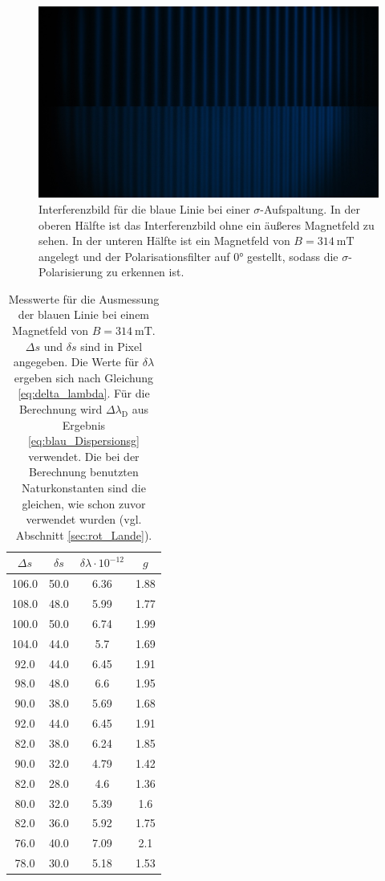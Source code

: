 \begin{figure}
  \centering
  \includegraphics[width=\textwidth]{blaucut5A.JPG}
  \caption{Interferenzbild für die blaue Linie bei einer $\sigma$-Aufspaltung.
  In der oberen Hälfte ist das Interferenzbild
  ohne ein äußeres Magnetfeld zu sehen. In der unteren Hälfte ist ein Magnetfeld von
  $B=\SI{314}{\milli\tesla}$ angelegt und der Polarisationsfilter auf $0°$ gestellt, sodass
  die $\sigma$-Polarisierung zu erkennen ist.}
  \label{fig:blausigmacut}
\end{figure}

\begin{table}
  \centering
  \caption{Messwerte für die Ausmessung der blauen Linie bei einem Magnetfeld von
  $B = \SI{314}{\milli\tesla}$. $\Delta s$ und $\delta s$ sind in Pixel angegeben.
  Die Werte für $\delta\lambda$ ergeben sich nach Gleichung \ref{eq:delta_lambda}.
  Für die Berechnung wird $\Delta \lambda_\text{D}$ aus Ergebnis \ref{eq:blau_Dispersionsg}
  verwendet. Die bei der Berechnung benutzten Naturkonstanten sind die gleichen, wie
  schon zuvor verwendet wurden (vgl. Abschnitt \ref{sec:rot_Lande}).}
  \label{tab:blausigma}
  \begin{tabular}{c | c | c | c}
    \toprule
    $\Delta s$ & $\delta s$ & $\delta \lambda \cdot 10^{-12}$ & $g$\\
    \midrule
    106.0 & 50.0 & 6.36 & 1.88 \\
    108.0 & 48.0 & 5.99 & 1.77 \\
    100.0 & 50.0 & 6.74 & 1.99 \\
    104.0 & 44.0 & 5.7 & 1.69 \\
    92.0 & 44.0 & 6.45 & 1.91 \\
    98.0 & 48.0 & 6.6 & 1.95 \\
    90.0 & 38.0 & 5.69 & 1.68 \\
    92.0 & 44.0 & 6.45 & 1.91 \\
    82.0 & 38.0 & 6.24 & 1.85 \\
    90.0 & 32.0 & 4.79 & 1.42 \\
    82.0 & 28.0 & 4.6 & 1.36 \\
    80.0 & 32.0 & 5.39 & 1.6 \\
    82.0 & 36.0 & 5.92 & 1.75 \\
    76.0 & 40.0 & 7.09 & 2.1 \\
    78.0 & 30.0 & 5.18 & 1.53 \\
    \bottomrule
  \end{tabular}
\end{table}

